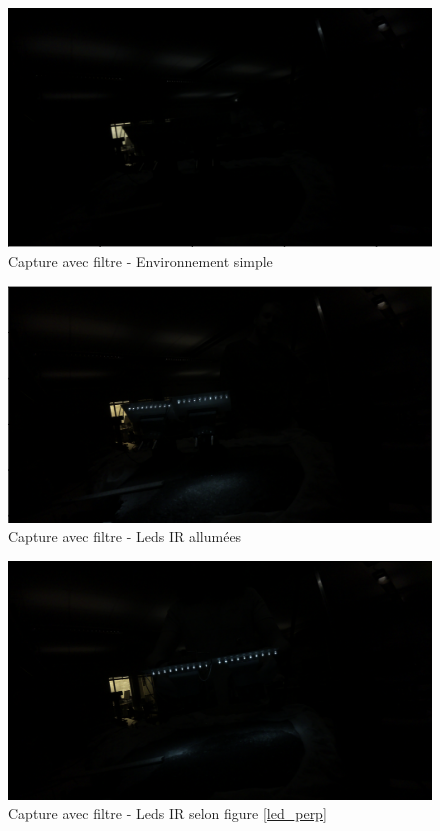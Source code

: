 \begin{figure}[H]
    \centering
    \includegraphics[width=13cm]{assets/figures/filtre_simple.png}
    \caption{Capture avec filtre - Environnement simple}
\end{figure}
\begin{figure}[H]
    \centering
    \includegraphics[width=13cm]{assets/figures/filtre_IR.png}
    \caption{Capture avec filtre - Leds IR allumées}
\end{figure}
\begin{figure}[H]
    \centering
    \includegraphics[width=13cm]{assets/figures/filtre_IR_huile.png}
    \caption{Capture avec filtre - Leds IR selon figure \ref{led_perp}}
\end{figure}
